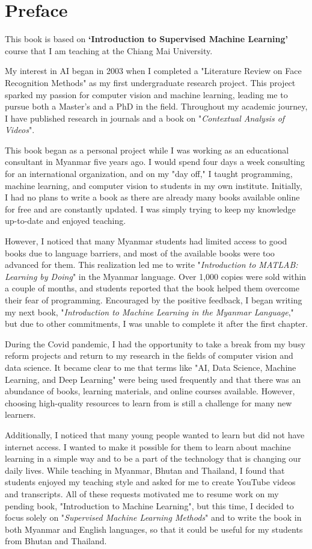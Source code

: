 \chapter*{Preface}

This book is based on \textbf{`Introduction to Supervised Machine Learning'} course that I am teaching at the Chiang Mai University.

My interest in AI began in 2003 when I completed a "Literature Review on Face Recognition Methods" as my first undergraduate research project. This project sparked my passion for computer vision and machine learning, leading me to pursue both a Master's and a PhD in the field. Throughout my academic journey, I have published research in journals and a book on "\emph{Contextual Analysis of Videos}".

This book began as a personal project while I was working as an educational consultant in Myanmar five years ago. I would spend four days a week consulting for an international organization, and on my "day off," I taught programming, machine learning, and computer vision to students in my own institute. Initially, I had no plans to write a book as there are already many books available online for free and are constantly updated. I was simply trying to keep my knowledge up-to-date and enjoyed teaching.

However, I noticed that many Myanmar students had limited access to good books due to language barriers, and most of the available books were too advanced for them. This realization led me to write "\emph{Introduction to MATLAB: Learning by Doing}" in the Myanmar language. Over 1,000 copies were sold within a couple of months, and students reported that the book helped them overcome their fear of programming. Encouraged by the positive feedback, I began writing my next book, "\emph{Introduction to Machine Learning in the Myanmar Language}," but due to other commitments, I was unable to complete it after the first chapter.

During the Covid pandemic, I had the opportunity to take a break from my busy reform projects and return to my research in the fields of computer vision and data science. It became clear to me that terms like "AI, Data Science, Machine Learning, and Deep Learning" were being used frequently and that there was an abundance of books, learning materials, and online courses available. However, choosing high-quality resources to learn from is still a challenge for many new learners.

Additionally, I noticed that many young people wanted to learn but did not have internet access. I wanted to make it possible for them to learn about machine learning in a simple way and to be a part of the technology that is changing our daily lives. While teaching in Myanmar, Bhutan and Thailand, I found that students enjoyed my teaching style and asked for me to create YouTube videos and transcripts. All of these requests motivated me to resume work on my pending book, "Introduction to Machine Learning", but this time, I decided to focus solely on "\emph{Supervised Machine Learning Methods}" and to write the book in both Myanmar and English languages, so that it could be useful for my students from Bhutan and Thailand.

